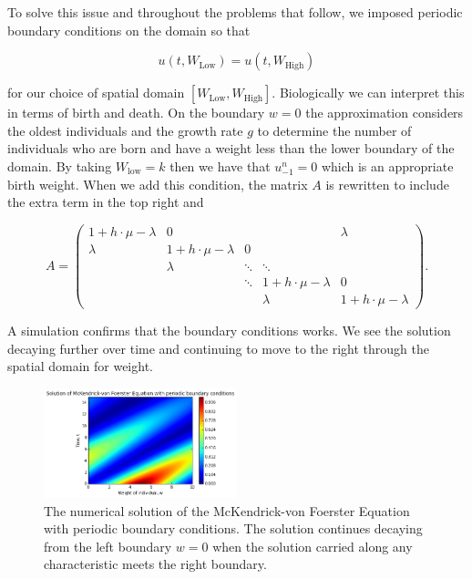 \documentclass[../main.tex]{subfiles}
\begin{document}
  To solve this issue and throughout the problems that follow, we imposed periodic boundary conditions on the domain so that

  \begin{equation}
    u(t, W_{\mathrm{Low}}) = u(t, W_{\mathrm{High}})
  \end{equation}

  for our choice of spatial domain $[W_{\mathrm{Low}}, W_{\mathrm{High}}]$. Biologically we can interpret this in terms of birth and death. On the boundary $w = 0$ the approximation considers the oldest individuals and the growth rate $g$ to determine the number of individuals who are born and have a weight less than the lower boundary of the domain. By taking $W_{\mathrm{low}} = k$ then we have that $u^n_{-1} = 0$ which is an appropriate birth weight. When we add this condition, the matrix $A$ is rewritten to include the extra term in the top right and

  \begin{equation}
    A = \begin{pmatrix}
      1 + h \cdot \mu - \lambda   & 0                         &         &                           & \lambda \\
      \lambda                     & 1 + h \cdot \mu - \lambda & 0       &\\
                                  & \lambda                   & \ddots  & \ddots                    & \\
                                  &                           & \ddots  & 1 + h \cdot \mu - \lambda & 0 \\
                                  &                           &         & \lambda                   & 1 + h \cdot \mu - \lambda
    \end{pmatrix}.
  \end{equation}

  A simulation confirms that the boundary conditions works. We see the solution decaying further over time and continuing to move to the right through the spatial domain for weight.

  \begin{figure}[htb]
    \centering
    \includegraphics[width=0.5\textwidth]{_assets/advection_period.png}
    \caption{\label{method:fig:advectionPeriodic} The numerical solution of the McKendrick-von Foerster Equation with periodic boundary conditions. The solution continues decaying from the left boundary $w = 0$ when the solution carried along any characteristic meets the right boundary.}
  \end{figure}
\end{document}
